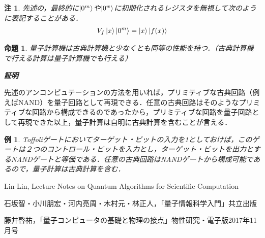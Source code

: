\documentclass[dvipdfmx]{jarticle}
\makeatletter
\numberwithin{equation}{section}
\renewenvironment{proof}[1][\proofname]{\par
  \pushQED{\qed}
  \normalfont \topsep6\p@\@plus6\p@\relax
  \trivlist
  \item\relax
  {\itshape
  #1\@addpunct{ }}\hspace\labelsep\ignorespaces
}{
  \popQED\endtrivlist\@endpefalse
}
\theoremstyle{seminar}
\newtheorem{proposition}{命題}[section]
\newtheorem{example}{例}[section]
\newtheorem{remark}{注}[section]
\newtheorem*{solution}{（解）}
\renewcommand{\proofname}{\textbf{証明}}
\makeatother
\begin{document}
\begin{remark}
  先述の，最終的に$\ket{0^m}$や$\ket{0^w}$に初期化されるレジスタを無視して次のように表記することがある．
  \begin{align}
    V_f \ket{x}\ket{0^m} = \ket{x}\ket{f(x)}
  \end{align}
\end{remark}
\begin{proposition}
  量子計算機は古典計算機と少なくとも同等の性能を持つ．（古典計算機で行える計算は量子計算機でも行える）
\end{proposition}

\begin{proof}
  先述のアンコンピュテーションの方法を用いれば，プリミティブな古典回路（例えばNAND）を量子回路として再現できる．任意の古典回路はそのようなプリミティブな回路から構成できるのであったから，プリミティブな回路を量子回路として再現できた以上，量子計算は自明に古典計算を含むことが言える．
\end{proof}

\begin{example}
  Toffoliゲートにおいてターゲット・ビットの入力を1としておけば，このゲートは２つのコントロール・ビットを入力とし，ターゲット・ビットを出力とするNANDゲートと等価である．任意の古典回路はNANDゲートから構成可能であるので，量子計算は古典計算を含む．
\end{example}



  

\begin{thebibliography}{9}
\item Lin Lin, Lecture Notes on Quantum Algorithms for Scientific Computation
\item 石坂智・小川朋宏・河内亮周・木村元・林正人，「量子情報科学入門」共立出版
\item 藤井啓祐，「量子コンピュータの基礎と物理の接点」物性研究・電子版2017年11月号
\end{thebibliography}
\end{document}
